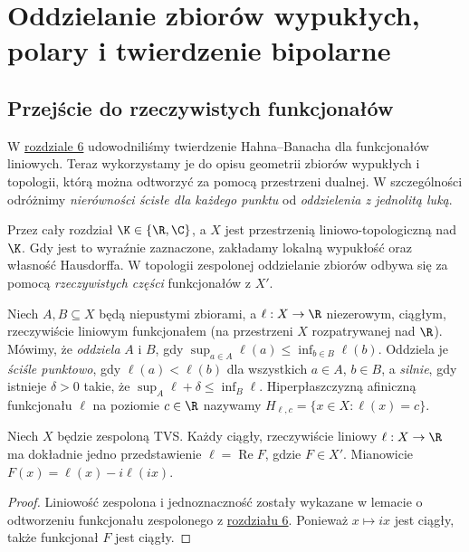 \setcounter{section}{6}
\section{Oddzielanie zbiorów wypukłych, polary i twierdzenie bipolarne}\label{sec:separacja-bipolarne}

\subsection{Przejście do rzeczywistych funkcjonałów}

W \hyperref[sec:hahn-banach]{rozdziale 6} udowodniliśmy twierdzenie Hahna--Banacha dla funkcjonałów liniowych.
Teraz wykorzystamy je do opisu geometrii zbiorów wypukłych i topologii,
którą można odtworzyć za pomocą przestrzeni dualnej. W szczególności odróżnimy
\emph{nierówności ścisłe dla każdego punktu} od \emph{oddzielenia z jednolitą luką}.

Przez cały rozdział $\K\in\{\R,\C\}$, a $X$ jest przestrzenią liniowo-topologiczną
nad $\K$. Gdy jest to wyraźnie zaznaczone, zakładamy lokalną wypukłość
oraz własność Hausdorffa. W topologii zespolonej oddzielanie zbiorów
odbywa się za pomocą \emph{rzeczywistych części} funkcjonałów z $X'$.

\begin{definicja}\label{def:separacja}
Niech $A,B\subseteq X$ będą niepustymi zbiorami, a
$\ell:X\to\R$ niezerowym, ciągłym, rzeczywiście liniowym funkcjonałem
(na przestrzeni $X$ rozpatrywanej nad $\R$). Mówimy, że
\emph{oddziela} $A$ i $B$, gdy
$\sup_{a\in A}\ell(a)\le\inf_{b\in B}\ell(b)$.
Oddziela je \emph{ściśle punktowo}, gdy $\ell(a)<\ell(b)$
dla wszystkich $a\in A$, $b\in B$, a \emph{silnie}, gdy istnieje
$\delta>0$ takie, że $\sup_A\ell+\delta\le\inf_B\ell$.
Hiperpłaszczyzną afiniczną funkcjonału $\ell$ na poziomie $c\in\R$
nazywamy $H_{\ell,c}=\{x\in X:\ell(x)=c\}$.
\end{definicja}

\begin{lemat}\label{lem:realification}
Niech $X$ będzie zespoloną TVS. Każdy ciągły, rzeczywiście liniowy
$\ell:X\to\R$ ma dokładnie jedno przedstawienie
$\ell=\operatorname{Re}F$, gdzie $F\in X'$. Mianowicie
$F(x)=\ell(x)-i\ell(ix)$.
\end{lemat}
\begin{proof}
Liniowość zespolona i jednoznaczność zostały wykazane w
lemacie o odtworzeniu funkcjonału zespolonego z \hyperref[sec:hahn-banach]{rozdziału 6}. Ponieważ $x\mapsto ix$
jest ciągły, także funkcjonał $F$ jest ciągły.
\end{proof}

